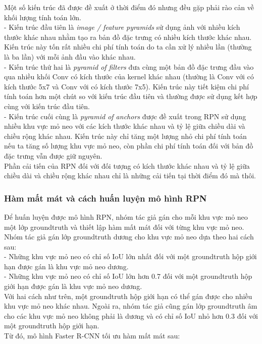 {    \noindent
    Một số kiến trúc đã được đề xuất ở thời điểm đó nhưng đều gặp phải rào cản về khối lượng tính toán lớn. \\
    - Kiến trúc đầu tiên là \textit{image / feature pyramids} sử dụng ảnh với nhiều kích thước khác nhau nhằm tạo ra bản đồ đặc trưng có nhiều kích thước khác nhau.
    Kiến trúc này tốn rất nhiều chi phí tính toán do ta cần xử lý nhiều lần (thường là ba lần) với mỗi ảnh đầu vào khác nhau. \\
    - Kiến trúc thứ hai là \textit{pyramid of filters} đưa cùng một bản đồ đặc trưng đầu vào qua nhiều khối Conv có kích thước của kernel khác nhau (thường là Conv với có kích thước 5x7 và Conv với có kích thước 7x5).
    Kiến trúc này tiết kiệm chi phí tính toán hơn một chút so với kiến trúc đầu tiên và thường được sử dụng kết hợp cùng với kiến trúc đầu tiên. \\
    - Kiến trúc cuối cùng là \textit{pyramid of anchors} được đề xuất trong RPN sử dụng nhiều khu vực mỏ neo với các kích thước khác nhau và tỷ lệ giữa chiều dài và chiều rộng khác nhau.
    Kiến trúc này chỉ tăng một lượng nhỏ chi phí tính toán nếu ta tăng số lượng khu vực mỏ neo, còn phần chi phí tính toán đối với bản đồ đặc trưng vẫn được giữ nguyên. \\
    Phần cải tiến của RPN đối với đối tượng có kích thước khác nhau và tỷ lệ giữa chiều dài và chiều rộng khác nhau chỉ là những cải tiến tại thời điểm đó mà thôi.

    \subsubsection*{Hàm mất mát và cách huấn luyện mô hình RPN}
    Để huấn luyện được mô hình RPN, nhóm tác giả gán cho mỗi khu vực mỏ neo một lớp groundtruth và thiết lập hàm mất mát đối với từng khu vực mỏ neo.
    Nhóm tác giả gán lớp groundtruth dương cho khu vực mỏ neo dựa theo hai cách sau: \\
    - Những khu vực mỏ neo có chỉ số IoU lớn nhất đối với một groundtruth hộp giới hạn được gán là khu vực mỏ neo dương. \\
    - Những khu vực mỏ neo có chỉ số IoU lớn hơn 0.7 đối với một groundtruth hộp giới hạn được gán là khu vực mỏ neo dương. \\
    Với hai cách như trên, một groundtruth hộp giới hạn có thể gán được cho nhiều khu vực mỏ neo khác nhau.
    Ngoài ra, nhóm tác giả cũng gán lớp groundtruth âm cho các khu vực mỏ neo không phải là dương và có chỉ số IoU nhỏ hơn 0.3 đối với một groundtruth hộp giới hạn. \\
    Từ đó, mô hình Faster R-CNN tối ưu hàm mất mát sau:

}
